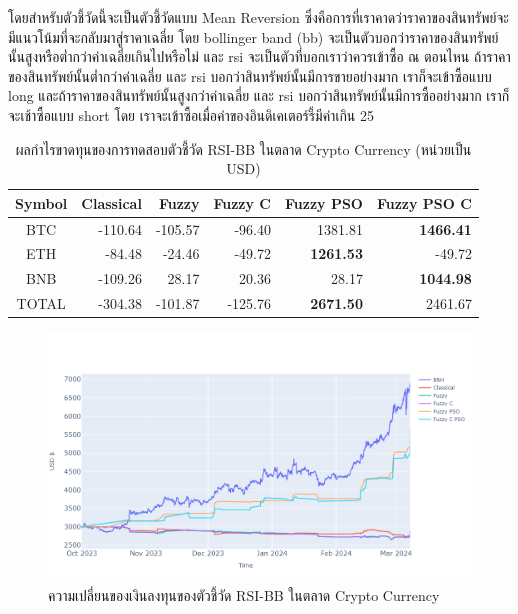 โดยสำหรับตัวชี้วัดนี้จะเป็นตัวชี้วัดแบบ Mean Reversion ซึ่งคือการที่เราคาดว่าราคาของสินทรัพย์จะมีแนวโน้มที่จะกลับมาสู่ราคาเฉลี่ย โดย bollinger band (bb) จะเป็นตัวบอกว่าราคาของสินทรัพย์นั้นสูงหรือต่ำกว่าค่าเฉลี่ยเกินไปหรือไม่ และ rsi จะเป็นตัวที่บอกเราว่าควรเข้าซื้อ ณ ตอนไหน ถ้าราคาของสินทรัพย์นั้นต่ำกว่าค่าเฉลี่ย และ rsi บอกว่าสินทรัพย์นั้นมีการขายอย่างมาก เราก็จะเข้าซื้อแบบ long และถ้าราคาของสินทรัพย์นั้นสูงกว่าค่าเฉลี่ย และ rsi บอกว่าสินทรัพย์นั้นมีการซื้ออย่างมาก เราก็จะเช้าซื้อแบบ short โดย เราจะเข้าซื้อเมื่อค่าของอินดิเคเตอร์รี้มีค่าเกิน 25

\begin{table}[!ht]
    \centering
    \begin{tabular}{crrrrr}
        \hline
        \textbf{Symbol} & \textbf{Classical} & \textbf{Fuzzy} & \textbf{Fuzzy C} & \textbf{Fuzzy PSO} & \textbf{Fuzzy PSO C} \\ \hline
        BTC             & -110.64            & -105.57        & -96.40           & 1381.81            & \textbf{1466.41}     \\ \hline
        ETH             & -84.48             & -24.46         & -49.72           & \textbf{1261.53}   & -49.72               \\ \hline
        BNB             & -109.26            & 28.17          & 20.36            & 28.17              & \textbf{1044.98}     \\ \hline
        TOTAL           & -304.38            & -101.87        & -125.76          & \textbf{2671.50}   & 2461.67              \\ \hline
    \end{tabular}
    \caption{ผลกำไรขาดทุนของการทดสอบตัวชี้วัด RSI-BB ในตลาด Crypto Currency (หน่วยเป็น USD)}
    \label{tab:rsi-bb-crypto}
\end{table}

\begin{figure}[!ht]
    \centering
    \includegraphics[width=\textwidth]{images/rsi-bb/crypto-result.png}
    \caption{ความเปลี่ยนของเงินลงทุนของตัวชี้วัด RSI-BB ในตลาด Crypto Currency}
\end{figure}

